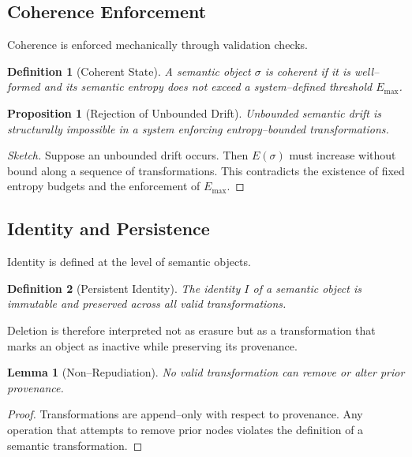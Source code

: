 \documentclass[11pt]{article}
\newtheorem{definition}{Definition}
\newtheorem{proposition}{Proposition}
\newtheorem{lemma}{Lemma}
\begin{document}
\subsection{Coherence Enforcement}

Coherence is enforced mechanically through validation checks.

\begin{definition}[Coherent State]
A semantic object $\sigma$ is \emph{coherent} if it is well--formed and its semantic
entropy does not exceed a system--defined threshold $E_{\max}$.
\end{definition}

\begin{proposition}[Rejection of Unbounded Drift]
Unbounded semantic drift is structurally impossible in a system enforcing entropy--bounded
transformations.
\end{proposition}

\begin{proof}[Sketch]
Suppose an unbounded drift occurs. Then $E(\sigma)$ must increase without bound along a
sequence of transformations. This contradicts the existence of fixed entropy budgets and
the enforcement of $E_{\max}$.
\end{proof}

\subsection{Identity and Persistence}

Identity is defined at the level of semantic objects.

\begin{definition}[Persistent Identity]
The identity $I$ of a semantic object is immutable and preserved across all valid
transformations.
\end{definition}

Deletion is therefore interpreted not as erasure but as a transformation that marks an
object as inactive while preserving its provenance.

\begin{lemma}[Non--Repudiation]
No valid transformation can remove or alter prior provenance.
\end{lemma}

\begin{proof}
Transformations are append--only with respect to provenance. Any operation that attempts
to remove prior nodes violates the definition of a semantic transformation.
\end{proof}
\end{document}
